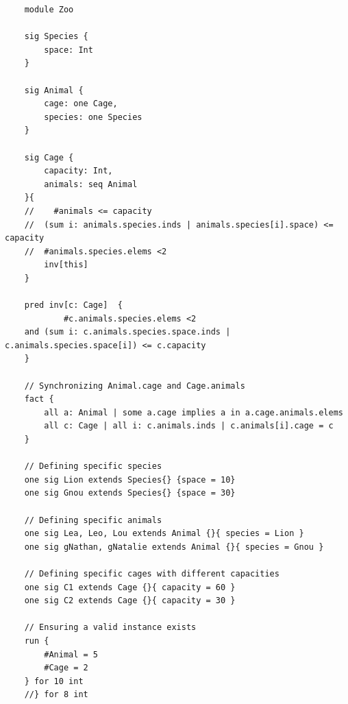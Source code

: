 \begin{lstlisting}
    module Zoo

    sig Species {
        space: Int
    }
    
    sig Animal {
        cage: one Cage,
        species: one Species
    }
    
    sig Cage {
        capacity: Int,
        animals: seq Animal
    }{
    //    #animals <= capacity
    //	(sum i: animals.species.inds | animals.species[i].space) <= capacity
    //	#animals.species.elems <2
        inv[this]
    }
    
    pred inv[c: Cage]  {
            #c.animals.species.elems <2		
    and (sum i: c.animals.species.space.inds | c.animals.species.space[i]) <= c.capacity 
    }
    
    // Synchronizing Animal.cage and Cage.animals
    fact {
        all a: Animal | some a.cage implies a in a.cage.animals.elems
        all c: Cage | all i: c.animals.inds | c.animals[i].cage = c
    }
    
    // Defining specific species
    one sig Lion extends Species{} {space = 10}
    one sig Gnou extends Species{} {space = 30}
    
    // Defining specific animals
    one sig Lea, Leo, Lou extends Animal {}{ species = Lion }
    one sig gNathan, gNatalie extends Animal {}{ species = Gnou }
    
    // Defining specific cages with different capacities
    one sig C1 extends Cage {}{ capacity = 60 }
    one sig C2 extends Cage {}{ capacity = 30 }
    
    // Ensuring a valid instance exists
    run {
        #Animal = 5
        #Cage = 2
    } for 10 int
    //} for 8 int    
\end{lstlisting}